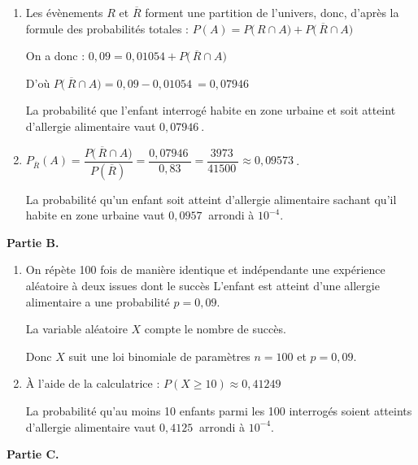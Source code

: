 \documentclass[10pt]{article}
\providecommand{\np}[2][]{{#2~#1}}
\begin{document}
\begin{enumerate}
\begin{enumerate}
		\item Les évènements $R$ et $\overline{R}$ forment une partition de l'univers, donc, d'après la formule des probabilités totales : \quad $P(A) = P\big(\,R\cap A\big) + P\big(\,\overline{R}\cap A\big) $

On a donc : \quad $0,09 = 0,01054 +P\big(\,\overline{R}\cap A\big) $

D'où  $P\big(\,\overline{R}\cap A\big) = 0,09-\np{0,01054}=\np{0,07946}$

La probabilité que l'enfant interrogé habite en zone urbaine et soit atteint d'allergie alimentaire vaut $\np{0,07946}$.

		\item $P_{\overline{R}}(A)=\dfrac{P\big(\,\overline{R}\cap A\big)}{P\left(\overline{R}\right)}= \dfrac{\np{0,07946}}{0,83}= \dfrac{\np{3973}}{\np{41500}}\approx \np{0,09573}$.

La probabilité qu'un enfant  soit atteint d'allergie alimentaire sachant qu'il habite en zone urbaine vaut $\np{0,0957}$ arrondi à $10^{-4}$.
	\end{enumerate}
\end{enumerate}

\smallskip

\textbf{Partie B.}

\medskip

\begin{enumerate}
\item On répète 100 fois de manière identique et indépendante une expérience aléatoire à deux issues dont le succès \og L'enfant est atteint d'une allergie alimentaire \fg{}  a une probabilité $p = 0,09$.

La variable aléatoire $X$ compte le nombre de succès.

Donc $X$ suit une loi binomiale de paramètres $n=100$ et $p = 0,09$.
\item À l'aide de la calculatrice : $P(X \geqslant 10)\approx \np{0,41249}$

La probabilité qu'au moins 10 enfants parmi les 100 interrogés soient atteints d'allergie alimentaire vaut $\np{0,4125}$ arrondi à $10^{-4}$.
\end{enumerate}

\smallskip

\textbf{Partie C.}

\medskip
\end{document}
